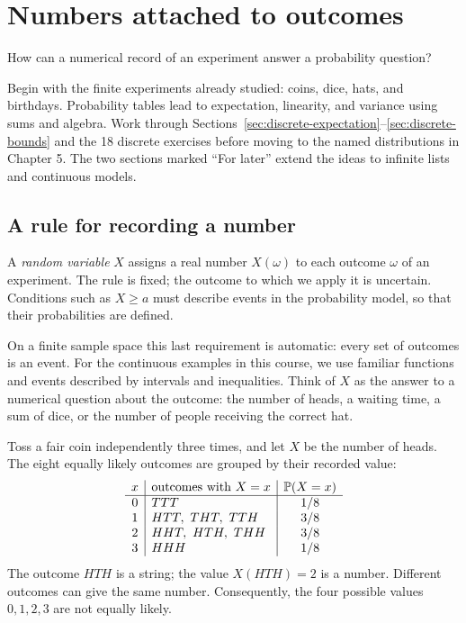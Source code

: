 \chapter{Numbers attached to outcomes}
\label{ch:random-variables}

\begin{question}
How can a numerical record of an experiment answer a probability question?
\end{question}

\begin{bigidea}[title={The next step: averages on discrete spaces}]
Begin with the finite experiments already studied: coins, dice, hats, and
birthdays. Probability tables lead to expectation, linearity, and variance
using sums and algebra. Work through
Sections~\ref{sec:discrete-expectation}--\ref{sec:discrete-bounds} and the
18 discrete exercises before moving to the named distributions in Chapter 5.
The two sections marked ``For later'' extend the ideas to infinite lists
and continuous models.
\end{bigidea}

\section{A rule for recording a number}

\begin{definition}
A \emph{random variable} $X$ assigns a real number $X(\omega)$ to each
outcome $\omega$ of an experiment. The rule is fixed; the outcome to which
we apply it is uncertain. Conditions such as $X\ge a$ must describe events
in the probability model, so that their probabilities are defined.
\end{definition}

On a finite sample space this last requirement is automatic: every set
of outcomes is an event. For the continuous examples in this course,
we use familiar functions and events described by intervals and
inequalities. Think of $X$ as the answer to a numerical question about
the outcome: the number of heads, a waiting time, a sum of dice, or the
number of people receiving the correct hat.

\begin{example}
Toss a fair coin independently three times, and let $X$ be the number
of heads. The eight equally likely outcomes are grouped by their recorded value:
\[
\begin{array}{c|l|c}
x&\text{outcomes with }X=x&\P(X=x)\\\hline
0&TTT&1/8\\
1&HTT,\ THT,\ TTH&3/8\\
2&HHT,\ HTH,\ THH&3/8\\
3&HHH&1/8
\end{array}
\]
The outcome $HTH$ is a string; the value $X(HTH)=2$ is a number.
Different outcomes can give the same number. Consequently, the four
possible values $0,1,2,3$ are not equally likely.
\end{example}

